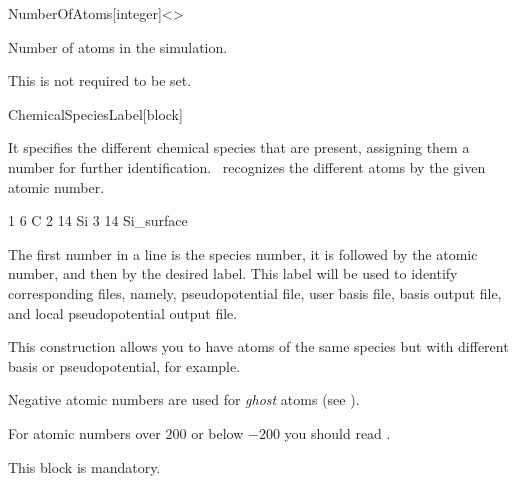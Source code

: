 \begin{fdfentry}{NumberOfAtoms}[integer]<>

  Number of atoms in the simulation.

  \note This is not required to be set.

\end{fdfentry}


\begin{fdfentry}{ChemicalSpeciesLabel}[block]

  It specifies the different chemical species that are
  present, assigning them a number for further identification.
  \siesta\ recognizes the different atoms by the given atomic number.

  \begin{fdfexample}
        1   6   C
        2  14   Si
        3  14   Si_surface
  \end{fdfexample}
  The first number in a line is the species number, it is followed by
  the atomic number, and then by the desired label. This label will be
  used to identify corresponding files, namely, pseudopotential file,
  user basis file, basis output file, and local pseudopotential output
  file.

  This construction allows you to have atoms of the same species but
  with different basis or pseudopotential, for example.

  Negative atomic numbers are used for \emph{ghost}
  atoms (see ).

  For atomic numbers over $200$ or below $-200$ you should read .

  \note This block is mandatory.
  
\end{fdfentry}


